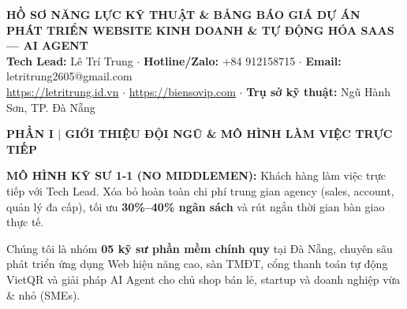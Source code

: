 \documentclass[11pt,a4paper]{article}
\newcommand{\sectionbanner}[2]{%
  \vspace{1mm}%
  \begin{tcolorbox}[colback=primary,colframe=primary,arc=1.5mm,boxrule=0pt,top=2mm,bottom=2mm,left=3mm,right=3mm]
    {\large\bfseries\color{white} #1 \quad$\vert$\quad \normalsize\color{white} #2}
  \end{tcolorbox}%
  \vspace{1mm}%
}
\begin{document}
\begin{tcolorbox}[colback=softbg,colframe=primary,arc=2.5mm,boxrule=1pt,top=2.5mm,bottom=2.5mm]
\begin{center}
    {\Large \textbf{\color{primary} HỒ SƠ NĂNG LỰC KỸ THUẬT \& BẢNG BÁO GIÁ DỰ ÁN}}\\[1.2mm]
    {\large \textbf{\color{primary} PHÁT TRIỂN WEBSITE KINH DOANH \& TỰ ĐỘNG HÓA SAAS --- AI AGENT}}\\[2mm]
    \small
    \textbf{Tech Lead:} Lê Trí Trung \quad$\cdot$\quad 
    \textbf{Hotline/Zalo:} +84 912158715 \quad$\cdot$\quad 
    \textbf{Email:} letritrung2605@gmail.com\\[0.5mm]
    \url{https://letritrung.id.vn} $\cdot$ \url{https://biensovip.com} $\cdot$ \textbf{Trụ sở kỹ thuật:} Ngũ Hành Sơn, TP. Đà Nẵng
\end{center}
\end{tcolorbox}

\sectionbanner{PHẦN I}{GIỚI THIỆU ĐỘI NGŨ \& MÔ HÌNH LÀM VIỆC TRỰC TIẾP}

\begin{tcolorbox}[colback=tagbg,colframe=primary,arc=2mm,boxrule=0.8pt,top=1.8mm,bottom=1.8mm]
\small
\textbf{\color{primary} MÔ HÌNH KỸ SƯ 1-1 (NO MIDDLEMEN):} Khách hàng làm việc trực tiếp với Tech Lead. Xóa bỏ hoàn toàn chi phí trung gian agency (sales, account, quản lý đa cấp), tối ưu \textbf{30\%--40\% ngân sách} và rút ngắn thời gian bàn giao thực tế.
\end{tcolorbox}

\vspace{1mm}
\noindent Chúng tôi là nhóm \textbf{05 kỹ sư phần mềm chính quy} tại Đà Nẵng, chuyên sâu phát triển ứng dụng Web hiệu năng cao, sàn TMĐT, cổng thanh toán tự động VietQR và giải pháp AI Agent cho chủ shop bán lẻ, startup và doanh nghiệp vừa \& nhỏ (SMEs).
\end{document}

